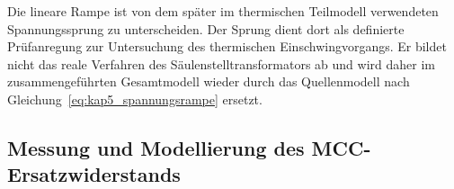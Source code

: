 



Die lineare Rampe ist von dem später im thermischen Teilmodell verwendeten
Spannungssprung zu unterscheiden. Der Sprung dient dort als definierte
Prüfanregung zur Untersuchung des thermischen Einschwingvorgangs. Er bildet
nicht das reale Verfahren des Säulenstelltransformators ab und wird daher im
zusammengeführten Gesamtmodell wieder durch das Quellenmodell nach
Gleichung~\eqref{eq:kap5_spannungsrampe} ersetzt.



\subsection{Messung und Modellierung des MCC-Ersatzwiderstands}
\label{sec:rmcc_messung_modellierung}

